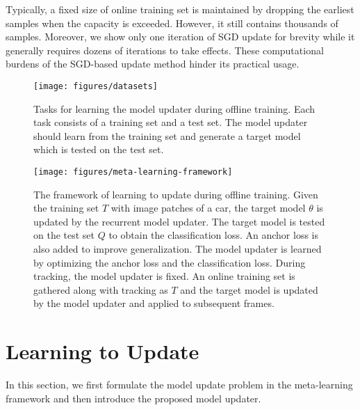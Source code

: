 \documentclass[journal]{IEEEtran}
\begin{document}
Typically, a fixed size of online training set is maintained by dropping the earliest samples when the capacity is exceeded. However, it still contains thousands of samples. Moreover, we show only one iteration of SGD update for brevity while it generally requires dozens of iterations to take effects. These computational burdens of the SGD-based update method hinder its practical usage.

\begin{figure}
	\centering
	\texttt{[image: figures/datasets]}
	\caption{Tasks for learning the model updater during offline training. Each task consists of a training set and a test set. The model updater should learn from the training set and generate a target model which is tested on the test set.}
	\label{fig:datasets}
\end{figure}

\begin{figure*}
	\centering
	\texttt{[image: figures/meta-learning-framework]}
	\caption{The framework of learning to update during offline training. Given the training set $T$ with image patches of a car, the target model $\theta$ is updated by the recurrent model updater. The target model is tested on the test set $Q$ to obtain the classification loss. An anchor loss is also added to improve generalization. The model updater is learned by optimizing the anchor loss and the classification loss. During tracking, the model updater is fixed. An online training set is gathered along with tracking as $T$ and the target model is updated by the model updater and applied to subsequent frames.}
	\label{fig:model-updater-framework}
\end{figure*}


\section{Learning to Update}\label{sec:learning-to-update}
In this section, we first formulate the model update problem in the meta-learning framework and then introduce the proposed model updater.
\end{document}
